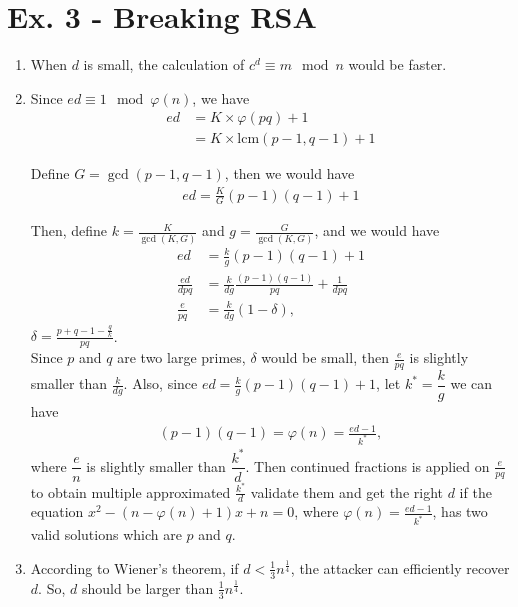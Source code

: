 \documentclass[a4paper,12pt]{journal}
\begin{document}
		\section*{Ex. 3 - Breaking RSA}
		\begin{enumerate}
			\item When $d$ is small, the calculation of $c^{d} \equiv m \mod n$ would be faster.
			
			\item Since $ed \equiv 1 \mod \varphi(n)$, we have
			\begin{align*}
				ed &= K \times \varphi(pq) + 1 \\
				&= K \times \mathrm{lcm}(p-1, q-1) + 1
			\end{align*}
			\par Define $G = \gcd(p-1,q-1)$, then we would have
			\begin{align*}
				ed = \frac{K}{G}(p-1)(q-1) + 1
			\end{align*}
			\par Then, define $k = \frac{K}{\gcd(K,G)}$ and $g = \frac{G}{\gcd(K,G)}$, and we would have
			\begin{align*}
				ed &= \frac{k}{g}(p-1)(q-1) + 1 \\
				\frac{ed}{dpq} &= \frac{k}{dg}\frac{(p-1)(q-1)}{pq} + \frac{1}{dpq} \\
				\frac{e}{pq} &= \frac{k}{dg}(1-\delta),
			\end{align*}
			$\delta = \frac{p + q - 1 - \frac{g}{k}}{pq}$. \\
			Since $p$ and $q$ are two large primes, $\delta$ would be small, then $\frac{e}{pq}$ is slightly smaller than $\frac{k}{dg}$. Also, since $ed = \frac{k}{g}(p-1)(q-1) + 1$, let $k^{*} = \dfrac{k}{g}$ we can have
			\begin{align*}
				(p-1)(q-1) = \varphi(n) = \frac{ed-1}{k^{*}},
			\end{align*}
			where $\dfrac{e}{n}$ is slightly smaller than $\dfrac{k^{*}}{d}$. Then continued fractions is applied on $\frac{e}{pq}$ to obtain multiple approximated $\frac{k^{*}}{d}$ validate them and get the right $d$ if the equation $x^{2} - (n-\varphi(n) + 1)x + n = 0$, where $\varphi(n) = \frac{ed - 1}{k^{*}}$, has two valid solutions which are $p$ and $q$.
			
			\item According to Wiener's theorem, if $d < \frac{1}{3}n^{\frac{1}{4}}$, the attacker can efficiently recover $d$. So, $d$ should be larger than $\frac{1}{3}n^{\frac{1}{4}}$.
			

\end{enumerate}
\end{document}
